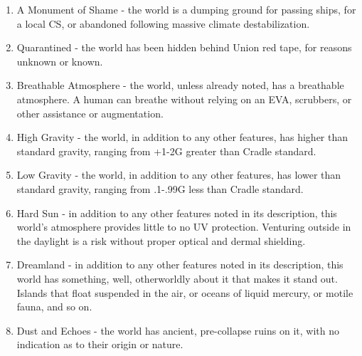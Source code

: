 \begin{enumerate}
    \item A Monument of Shame - the world is a dumping ground for passing ships, for a local CS, or abandoned following massive climate destabilization.
    \item Quarantined - the world has been hidden behind Union red tape, for reasons unknown or known.
    \item Breathable Atmosphere - the world, unless already noted, has a breathable atmosphere. A human can breathe without relying on an EVA, scrubbers, or other assistance or augmentation.
    \item High Gravity - the world, in addition to any other features, has higher than standard gravity, ranging from +1-2G greater than Cradle standard.
    \item Low Gravity - the world, in addition to any other features, has lower than standard gravity, ranging from .1-.99G less than Cradle standard.
    \item Hard Sun - in addition to any other features noted in its description, this world’s atmosphere provides little to no UV protection. Venturing outside in the daylight is a risk without proper optical and dermal shielding.
    \item Dreamland - in addition to any other features noted in its description, this world has something, well, otherworldly about it that makes it stand out. Islands that float suspended in the air, or oceans of liquid mercury, or motile fauna, and so on.
    \item Dust and Echoes - the world has ancient, pre-collapse ruins on it, with no indication as to their origin or nature.
\end{enumerate}

